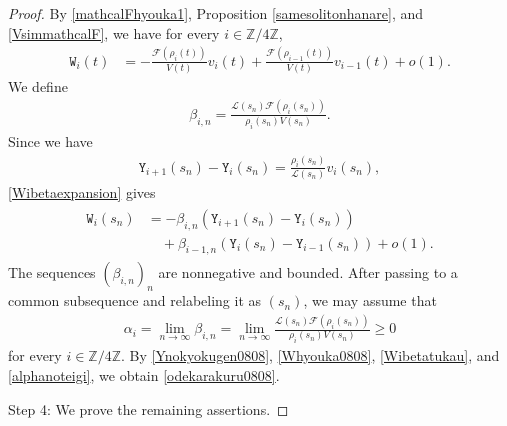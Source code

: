 \documentclass[reqno]{amsart}
\theoremstyle{plain}
\theoremstyle{definition}
\numberwithin{equation}{section}
\begin{document}
\begin{proof}
By \eqref{mathcalFhyouka1}, Proposition \ref{samesolitonhanare}, and \eqref{VsimmathcalF}, we have for every
$i\in\mathbb{Z}/4\mathbb{Z}$,
\begin{align}\label{Wibetaexpansion}
\mathtt{W}_i(t)&=-\frac{\mathcal{F}(\rho_i(t))}{V(t)}v_i(t)+\frac{\mathcal{F}(\rho_{i-1}(t))}{V(t)}v_{i-1}(t)+o(1).
\end{align}
We define
\begin{align*}
\beta_{i,n}=\frac{\mathcal{L}(s_n)\mathcal{F}(\rho_i(s_n))}{\rho_i(s_n)V(s_n)}.
\end{align*}
Since we have 
\begin{align*}
\mathtt{Y}_{i+1}(s_n)-\mathtt{Y}_i(s_n)=\frac{\rho_i(s_n)}{\mathcal{L}(s_n)}v_i(s_n),
\end{align*}
\eqref{Wibetaexpansion} gives
\begin{align}\label{Wibetatukau}
\begin{aligned}
\mathtt{W}_i(s_n)&=-\beta_{i,n}\left(\mathtt{Y}_{i+1}(s_n)-\mathtt{Y}_i(s_n)\right)
\\
&\quad+\beta_{i-1,n}\left(\mathtt{Y}_i(s_n)-\mathtt{Y}_{i-1}(s_n)\right)+o(1).
\end{aligned}
\end{align}
The sequences $(\beta_{i,n})_n$ are nonnegative and bounded. After passing to a common subsequence and relabeling it as $(s_n)$, we may assume that
\begin{align}\label{alphanoteigi}
\alpha_i=\lim_{n\to\infty}\beta_{i,n}=\lim_{n\to\infty}\frac{\mathcal{L}(s_n)\mathcal{F}(\rho_i(s_n))}{\rho_i(s_n)V(s_n)}\geq 0
\end{align}
for every $i\in\mathbb{Z}/4\mathbb{Z}$. By \eqref{Ynokyokugen0808}, \eqref{Whyouka0808}, \eqref{Wibetatukau}, and \eqref{alphanoteigi}, we obtain \eqref{odekarakuru0808}.



Step 4: We prove the remaining assertions.



\end{proof}
\end{document}
